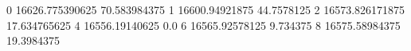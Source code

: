 0 16626.775390625 70.583984375
1 16600.94921875 44.7578125
2 16573.826171875 17.634765625
4 16556.19140625 0.0
6 16565.92578125 9.734375
8 16575.58984375 19.3984375
